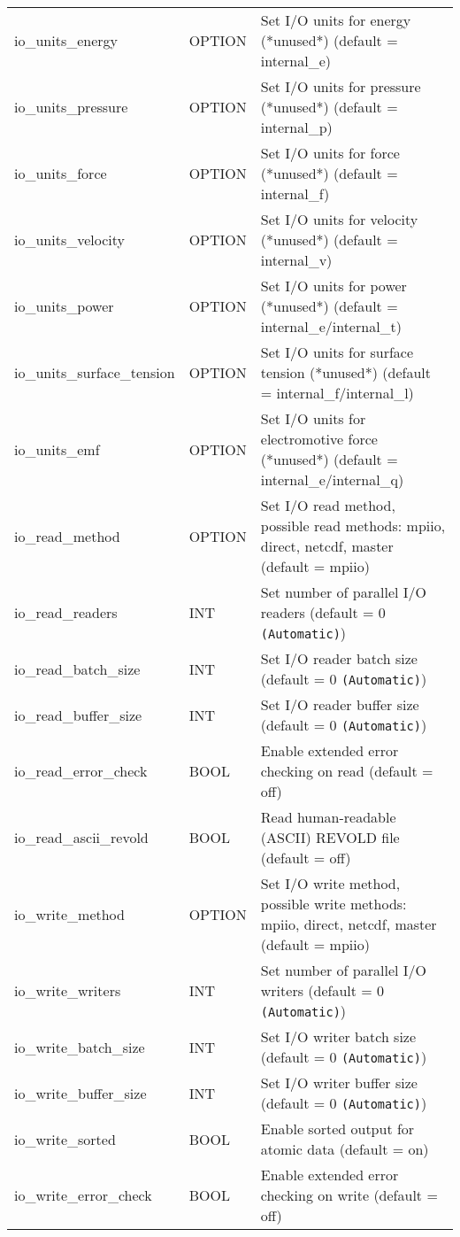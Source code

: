 \begin{longtable}{l l p{10cm}}
io\_units\_energy & OPTION & Set I/O units for energy (*unused*) (default = internal\_e) \\
io\_units\_pressure & OPTION & Set I/O units for pressure (*unused*) (default = internal\_p) \\
io\_units\_force & OPTION & Set I/O units for force (*unused*) (default = internal\_f) \\
io\_units\_velocity & OPTION & Set I/O units for velocity (*unused*) (default = internal\_v) \\
io\_units\_power & OPTION & Set I/O units for power (*unused*) (default = internal\_e/internal\_t) \\
io\_units\_surface\_tension & OPTION & Set I/O units for surface tension (*unused*) (default = internal\_f/internal\_l) \\
io\_units\_emf & OPTION & Set I/O units for electromotive force (*unused*) (default = internal\_e/internal\_q) \\
io\_read\_method & OPTION & Set I/O read method, possible read methods: mpiio, direct, netcdf, master (default = mpiio) \\
io\_read\_readers & INT & Set number of parallel I/O readers (default = 0 \verb#(Automatic)#) \\
io\_read\_batch\_size & INT & Set I/O reader batch size (default = 0 \verb#(Automatic)#) \\
io\_read\_buffer\_size & INT & Set I/O reader buffer size (default = 0 \verb#(Automatic)#) \\
io\_read\_error\_check & BOOL & Enable extended error checking on read (default = off) \\
io\_read\_ascii\_revold & BOOL & Read human-readable (ASCII) REVOLD file (default = off) \\
io\_write\_method & OPTION & Set I/O write method, possible write methods: mpiio, direct, netcdf, master (default = mpiio) \\
io\_write\_writers & INT & Set number of parallel I/O writers (default = 0 \verb#(Automatic)#) \\
io\_write\_batch\_size & INT & Set I/O writer batch size (default = 0 \verb#(Automatic)#) \\
io\_write\_buffer\_size & INT & Set I/O writer buffer size (default = 0 \verb#(Automatic)#) \\
io\_write\_sorted & BOOL & Enable sorted output for atomic data (default = on) \\
io\_write\_error\_check & BOOL & Enable extended error checking on write (default = off) \\

\end{longtable}
